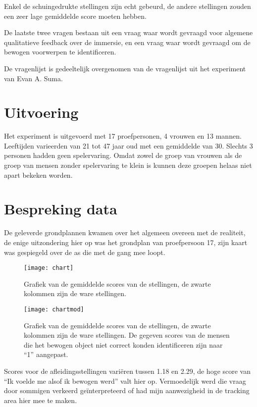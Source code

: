 Enkel de schuingedrukte stellingen zijn echt gebeurd, de andere stellingen zouden
een zeer lage gemiddelde score moeten hebben.

De laatste twee vragen bestaan uit een vraag waar wordt gevraagd voor algemene
qualitatieve feedback over de immersie, en een vraag waar wordt gevraagd om de 
bewogen voorwerpen te identificeren.

De vragenlijst is gedeeltelijk overgenomen van de vragenlijst uit het experiment
van Evan A. Suma\cite{suma11}.


\section{Uitvoering}
Het experiment is uitgevoerd met 17 proefpersonen, 4 vrouwen en 13 mannen.
Leeftijden varieerden van 21 tot 47 jaar oud met een gemiddelde van 30. Slechts
3 personen hadden geen spelervaring. Omdat zowel de groep van vrouwen als de
groep van mensen zonder spelervaring te klein is kunnen deze groepen helaas
niet apart bekeken worden.


\section{Bespreking data}
De geleverde grondplannen kwamen over het algemeen overeen met de realiteit, de
enige uitzondering hier op was het grondplan van proefpersoon 17, zijn kaart was
gespiegeld over de as die met de gang mee loopt.

\begin{figure}[p]
    \centering
    \texttt{[image: chart]}
    \caption{Grafiek van de gemiddelde scores van de stellingen, de zwarte 
    kolommen zijn de ware stellingen.}
    \label{fig:chart}
\end{figure}

\begin{figure}[p]
    \centering
    \texttt{[image: chartmod]}
    \caption{Grafiek van de gemiddelde scores van de stellingen, de zwarte 
    kolommen zijn de ware stellingen. De gegeven scores van de mensen die het
    bewogen object niet correct konden identificeren zijn naar ``1'' aangepast.}
    \label{fig:chartmod}
\end{figure}

Scores voor de afleidingsstellingen vari\"eren tussen 1.18 en 2.29, de hoge score
van ``Ik voelde me alsof ik bewogen werd'' valt hier op. Vermoedelijk werd die
vraag door sommigen verkeerd ge\"interpreteerd of had mijn aanwezigheid in de
tracking area hier mee te maken.

